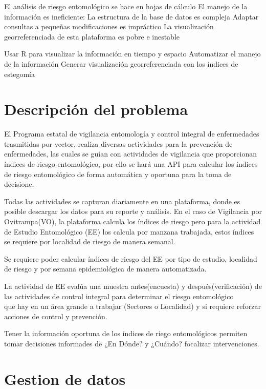 \documentclass[
  letterpaper,
  twocolumn,
  landscape]{report}
\begin{document}
El análisis de riesgo entomológico se hace en hojas de cálculo El manejo
de la información es ineficiente: La estructura de la base de datos es
compleja Adaptar consultas a pequeñas modificaciones es impráctico La
visualización georreferenciada de esta plataforma es pobre e inestable

Usar R para visualizar la información en tiempo y espacio Automatizar el
manejo de la información Generar visualización georreferenciada con los
índices de estegomía

\section{Descripción del problema}\label{descripciuxf3n-del-problema}

El Programa estatal de vigilancia entomología y control integral de
enfermedades trasmitidas por vector, realiza diversas actividades para
la prevención de enfermedades, las cuales se guían con actividades de
vigilancia que proporcionan índices de riesgo entomológico, por ello se
hará una API para calcular los índices de riesgo entomológico de forma
automática y oportuna para la toma de decisione.

Todas las actividades se capturan diariamente en una plataforma, donde
es posible descargar los datos para su reporte y análisis. En el caso de
Vigilancia por Ovitrampa(VO), la plataforma calcula los índices de
riesgo pero para la actividad de Estudio Entomológico (EE) los calcula
por manzana trabajada, estos índices se requiere por localidad de riesgo
de manera semanal.

Se requiere poder calcular índices de riesgo del EE por tipo de estudio,
localidad de riesgo y por semana epidemiológica de manera automatizada.

La actividad de EE evalúa una muestra antes(encuesta) y
después(verificación) de las actividades de control integral para
determinar el riesgo entomológico\\
que hay en un área grande a trabajar (Sectores o Localidad) y si
requiere reforzar acciones de control y prevención.

Tener la información oportuna de los índices de riego entomológicos
permiten tomar decisiones informades de ¿En Dónde? y ¿Cuándo? focalizar
intervenciones.

\section{Gestion de datos}\label{gestion-de-datos}
\end{document}

